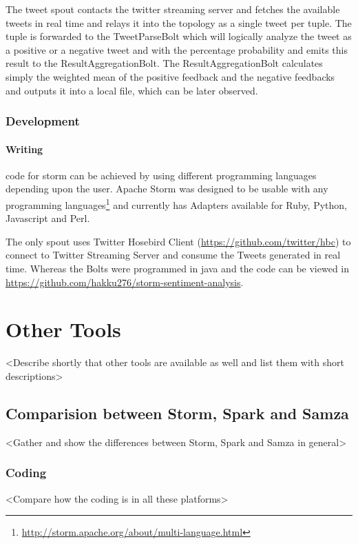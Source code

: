 \documentclass[runningheads,a4paper]{llncs}[2015/06/24]
\begin{document}
The tweet spout contacts the twitter streaming server and fetches the available tweets in real time and relays it into the topology as a single tweet per tuple. The tuple is forwarded to the TweetParseBolt which will logically analyze the tweet as a positive or a negative tweet and with the percentage probability and emits this result to the ResultAggregationBolt. The ResultAggregationBolt calculates simply the weighted mean of the positive feedback and the negative feedbacks and outputs it into a local file, which can be later observed.

\subsubsection{Development}
\paragraph{Writing} code for storm can be achieved by using different programming languages depending upon the user. Apache Storm was designed to be usable with any programming languages\footnote{\url{http://storm.apache.org/about/multi-language.html}} and currently has Adapters available for Ruby, Python, Javascript and Perl.

The only spout uses Twitter Hosebird Client (\url{https://github.com/twitter/hbc}) to connect to Twitter Streaming Server and consume the Tweets generated in real time. Whereas the Bolts were programmed in java and the code can be viewed in \url{https://github.com/hakku276/storm-sentiment-analysis}.

\section{Other Tools}
 \label{sec:othertools}
 
 <Describe shortly that other tools are available as well and list them with short descriptions>
 
 \subsection{Comparision between Storm, Spark and Samza}
 
 <Gather and show the differences between Storm, Spark and Samza in general>
 
 \subsubsection{Coding}
 <Compare how the coding is in all these platforms>
 
\end{document}
